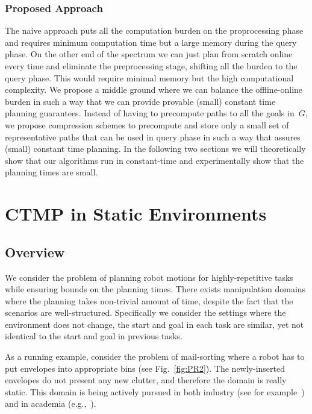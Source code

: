 \documentclass[a4paper,10pt]{article}
\begin{document}
{\subsubsection{Proposed Approach}
The naive approach puts all the computation burden on the proprocessing phase and requires minimum computation time but a large memory during the query phase. On the other end of the spectrum we can just plan from scratch online every time and eliminate the preprocessing stage, shifting all the burden to the query phase. This would require minimal memory but the high computational complexity. We propose a middle ground where we can balance the offline-online burden in such a way that we can provide provable (small) constant time planning guarantees. Instead of having to precompute paths to all the goals in~$G$, we propose compression schemes to precompute and store only a small set of representative paths that can be used in query phase in such a way that assures (small) constant time planning. In the following two sections we will theoretically show that our algorithms run in constant-time and experimentally show that the planning times are small.
}

\newpage
\section{CTMP in Static Environments}
\subsection{Overview}
We consider the problem of planning robot motions for highly-repetitive tasks while ensuring bounds on the planning times. There exists manipulation domains where the planning takes non-trivial amount of time, despite the fact that the scenarios are well-structured. Specifically we consider the settings where the environment does not change, the start and goal in each task are similar, yet not identical to the start and goal in previous tasks.

As a running example, consider the problem of mail-sorting where a robot has to put envelopes into appropriate bins (see Fig.~\ref{fig:PR2}). The newly-inserted envelopes do not present any new clutter, and therefore the domain is really static. This domain is being actively pursued in both industry (see for example~\cite{DBot}) and in academia (e.g.,~\cite{hwang2015lazy}).

\end{document}
